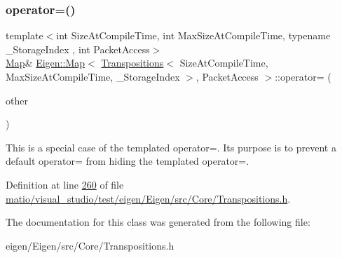 \mbox{\label{class_eigen_1_1_map_3_01_transpositions_3_01_size_at_compile_time_00_01_max_size_at_compile_timecc993082d7c0ba51ca94b27e97da8dd3_aaafbdb07fbd22f5ac9171e6b03d783f4}} 
\subsubsection{\texorpdfstring{operator=()}{operator=()}\hspace{0.1cm}{\footnotesize\ttfamily [4/4]}}
{\footnotesize\ttfamily template$<$int Size\+At\+Compile\+Time, int Max\+Size\+At\+Compile\+Time, typename \+\_\+\+Storage\+Index , int Packet\+Access$>$ \\
\hyperlink{group___core___module_class_eigen_1_1_map}{Map}\& \hyperlink{group___core___module_class_eigen_1_1_map}{Eigen\+::\+Map}$<$ \hyperlink{group___core___module_class_eigen_1_1_transpositions}{Transpositions}$<$ Size\+At\+Compile\+Time, Max\+Size\+At\+Compile\+Time, \+\_\+\+Storage\+Index $>$, Packet\+Access $>$\+::operator= (\begin{DoxyParamCaption}\item[{const \hyperlink{group___core___module_class_eigen_1_1_map}{Map}$<$ \hyperlink{group___core___module_class_eigen_1_1_transpositions}{Transpositions}$<$ Size\+At\+Compile\+Time, Max\+Size\+At\+Compile\+Time, \+\_\+\+Storage\+Index $>$, Packet\+Access $>$ \&}]{other }\end{DoxyParamCaption})\hspace{0.3cm}{\ttfamily [inline]}}

This is a special case of the templated operator=. Its purpose is to prevent a default operator= from hiding the templated operator=. 

Definition at line \hyperlink{matio_2visual__studio_2test_2eigen_2_eigen_2src_2_core_2_transpositions_8h_source_l00260}{260} of file \hyperlink{matio_2visual__studio_2test_2eigen_2_eigen_2src_2_core_2_transpositions_8h_source}{matio/visual\+\_\+studio/test/eigen/\+Eigen/src/\+Core/\+Transpositions.\+h}.



The documentation for this class was generated from the following file\+:\begin{DoxyCompactItemize}
\item 
eigen/\+Eigen/src/\+Core/\+Transpositions.\+h\end{DoxyCompactItemize}
